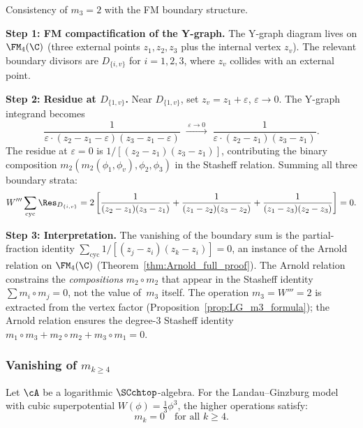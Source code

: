 \begin{computation}
\label{comp:m3_residue}
Consistency of $m_3 = 2$ with the FM boundary structure.

\textbf{Step 1: FM compactification of the Y-graph.}
The Y-graph diagram lives on $\FM_4(\C)$ (three external points $z_1, z_2, z_3$ plus the internal vertex $z_v$). The relevant boundary divisors are $D_{\{i,v\}}$ for $i = 1, 2, 3$, where $z_v$ collides with an external point.

\textbf{Step 2: Residue at $D_{\{1,v\}}$.}
Near $D_{\{1,v\}}$, set $z_v = z_1 + \varepsilon$, $\varepsilon \to 0$. The Y-graph integrand becomes
\begin{equation}
\frac{1}{\varepsilon \cdot (z_2 - z_1 - \varepsilon)
 (z_3 - z_1 - \varepsilon)}
\;\xrightarrow{\;\varepsilon \to 0\;}
\;\frac{1}{\varepsilon \cdot (z_2 - z_1)(z_3 - z_1)}.
\end{equation}
The residue at $\varepsilon = 0$ is $1/[(z_2 - z_1)(z_3 - z_1)]$, contributing the binary composition $m_2(m_2(\phi_1, \phi_v), \phi_2, \phi_3)$ in the Stasheff relation. Summing all three boundary strata:
\begin{equation}
W''' \sum_{\text{cyc}} \Res_{D_{\{i,v\}}}
= 2 \left[
 \frac{1}{(z_2 - z_1)(z_3 - z_1)}
 + \frac{1}{(z_1 - z_2)(z_3 - z_2)}
 + \frac{1}{(z_1 - z_3)(z_2 - z_3)}
\right] = 0.
\end{equation}

\textbf{Step 3: Interpretation.}
The vanishing of the boundary sum is the partial-fraction identity $\sum_{\text{cyc}} 1/[(z_j - z_i)(z_k - z_i)] = 0$, an instance of the Arnold relation on $\FM_4(\C)$ (Theorem~\ref{thm:Arnold_full_proof}). The Arnold relation constrains the \emph{compositions} $m_2 \circ m_2$ that appear in the Stasheff identity $\sum m_i \circ m_j = 0$, not the value of~$m_3$ itself. The operation $m_3 = W''' = 2$ is extracted from the vertex factor (Proposition~\ref{prop:LG_m3_formula}); the Arnold relation ensures the degree-$3$ Stasheff identity $m_1 \circ m_3 + m_2 \circ m_2 + m_3 \circ m_1 = 0$.
\end{computation}

\subsubsection{Vanishing of $m_{k \geq 4}$}

\begin{theorem}
\label{thm:LG_truncation}
Let\/ $\cA$ be a logarithmic\/ $\SCchtop$-algebra.
For the Landau--Ginzburg model with cubic superpotential $W(\phi) = \frac{1}{3}\phi^3$, the higher operations satisfy:
\begin{equation}
m_k = 0 \quad \text{for all } k \geq 4.
\end{equation}
\end{theorem}

